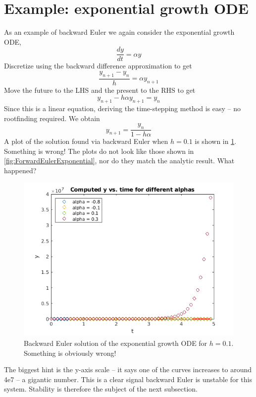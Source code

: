 \documentclass[hidelinks,notitlepage]{book}
\begin{document}
\section{Example: exponential growth ODE}
\label{sect:BkwdEulerExponentialGrowthODE}
As an example of backward Euler we again consider the exponential growth ODE,
\begin{equation}
\label{eq:ExpGrowthODE}
\frac{d y}{d t} = \alpha y
\end{equation}
Discretize using the backward difference approximation to get
\begin{equation}
\nonumber
\frac{y_{n+1} - y_n}{h} = \alpha y_{n+1}
\end{equation}
Move the future to the LHS and the present to the RHS to get
\begin{equation}
\nonumber
y_{n+1} - h \alpha y_{n+1} = y_n
\end{equation}
Since this is a linear equation, deriving the time-stepping method is easy -- no rootfinding required.  We obtain
\begin{equation}
\label{eq:BackwardEulerIterationLinearEq}
y_{n+1}= \frac{y_n}{1  - h \alpha }
\end{equation}
A plot of the solution found via backward Euler when $h = 0.1$ is shown in \cref{fig:BackwardEulerExponential}.  Something is wrong!  The plots do not look like those shown in \cref{fig:ForwardEulerExponential}, nor do they match the analytic result.  What happened?
\begin{figure}[tbh]
	\centering
	\includegraphics[width=0.5\columnwidth]{BackwardEulerExponential.png}
	\caption{Backward Euler solution of the exponential growth ODE for $h = 0.1$.  Something is obviously wrong!}
	\label{fig:BackwardEulerExponential}
\end{figure}
The biggest hint is the y-axis scale -- it says one of the curves increases to around 4e7 -- a gigantic number.  This is a clear signal backward Euler is unstable for this system.  Stability is therefore the subject of the next subsection.
\end{document}

